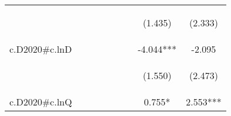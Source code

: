 \documentclass[]{article}
\begin{document}
\begin{center}
\begin{tabular}{lcccccccc}
\vspace{4pt} & \begin{footnotesize}\end{footnotesize} & \begin{footnotesize}\end{footnotesize} & \begin{footnotesize}\end{footnotesize} & \begin{footnotesize}\end{footnotesize} & \begin{footnotesize}\end{footnotesize} & \begin{footnotesize}\end{footnotesize} & \begin{footnotesize}(1.435)\end{footnotesize} & \begin{footnotesize}(2.333)\end{footnotesize} \\
c.D2020\#c.lnD &  &  &  &  &  &  & -4.044*** & -2.095 \\
\vspace{4pt} & \begin{footnotesize}\end{footnotesize} & \begin{footnotesize}\end{footnotesize} & \begin{footnotesize}\end{footnotesize} & \begin{footnotesize}\end{footnotesize} & \begin{footnotesize}\end{footnotesize} & \begin{footnotesize}\end{footnotesize} & \begin{footnotesize}(1.550)\end{footnotesize} & \begin{footnotesize}(2.473)\end{footnotesize} \\
c.D2020\#c.lnQ &  &  &  &  &  &  & 0.755* & 2.553*** \\

\end{tabular}
\end{center}
\end{document}
